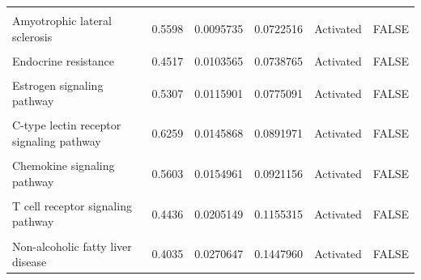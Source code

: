\documentclass[9pt,a4paper,]{extarticle}
\begin{document}
\begin{table}
{\begin{tabular}[t]{lrrrll}
\cellcolor{gray!6}{Transcriptional misregulation in cancer} & \cellcolor{gray!6}{0.5247} & \cellcolor{gray!6}{0.0083880} & \cellcolor{gray!6}{0.0664828} & \cellcolor{gray!6}{Activated} & \cellcolor{gray!6}{FALSE}\\
Amyotrophic lateral sclerosis & 0.5598 & 0.0095735 & 0.0722516 & Activated & FALSE\\
\cellcolor{gray!6}{Autophagy - other} & \cellcolor{gray!6}{0.5089} & \cellcolor{gray!6}{0.0097911} & \cellcolor{gray!6}{0.0722516} & \cellcolor{gray!6}{Activated} & \cellcolor{gray!6}{FALSE}\\
Endocrine resistance & 0.4517 & 0.0103565 & 0.0738765 & Activated & FALSE\\
\addlinespace
\cellcolor{gray!6}{cAMP signaling pathway} & \cellcolor{gray!6}{0.4566} & \cellcolor{gray!6}{0.0111216} & \cellcolor{gray!6}{0.0767749} & \cellcolor{gray!6}{Activated} & \cellcolor{gray!6}{FALSE}\\
Estrogen signaling pathway & 0.5307 & 0.0115901 & 0.0775091 & Activated & FALSE\\
\cellcolor{gray!6}{Leishmaniasis} & \cellcolor{gray!6}{0.5675} & \cellcolor{gray!6}{0.0130130} & \cellcolor{gray!6}{0.0843876} & \cellcolor{gray!6}{Activated} & \cellcolor{gray!6}{FALSE}\\
C-type lectin receptor signaling pathway & 0.6259 & 0.0145868 & 0.0891971 & Activated & FALSE\\
\cellcolor{gray!6}{Growth hormone synthesis, secretion and action} & \cellcolor{gray!6}{0.4164} & \cellcolor{gray!6}{0.0145883} & \cellcolor{gray!6}{0.0891971} & \cellcolor{gray!6}{Activated} & \cellcolor{gray!6}{FALSE}\\
\addlinespace
Chemokine signaling pathway & 0.5603 & 0.0154961 & 0.0921156 & Activated & FALSE\\
\cellcolor{gray!6}{Aldosterone-regulated sodium reabsorption} & \cellcolor{gray!6}{0.4137} & \cellcolor{gray!6}{0.0192526} & \cellcolor{gray!6}{0.1113530} & \cellcolor{gray!6}{Activated} & \cellcolor{gray!6}{FALSE}\\
T cell receptor signaling pathway & 0.4436 & 0.0205149 & 0.1155315 & Activated & FALSE\\
\cellcolor{gray!6}{Mitophagy - animal} & \cellcolor{gray!6}{0.4634} & \cellcolor{gray!6}{0.0224493} & \cellcolor{gray!6}{0.1231833} & \cellcolor{gray!6}{Activated} & \cellcolor{gray!6}{FALSE}\\
Non-alcoholic fatty liver disease & 0.4035 & 0.0270647 & 0.1447960 & Activated & FALSE\\

\end{tabular}}
\end{table}
\end{document}
